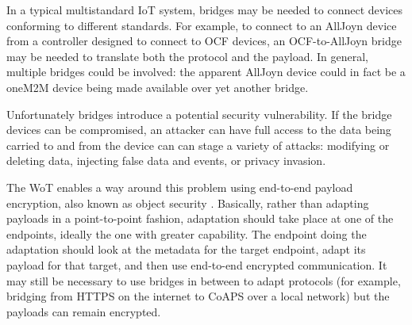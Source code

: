 In a typical multistandard IoT system,
bridges may be needed to connect devices
conforming to different standards.
For example,
to connect to an AllJoyn device from a controller
designed to connect to OCF devices, an OCF-to-AllJoyn bridge
may be needed to translate both the protocol and the payload.
In general, multiple bridges could be involved: the
apparent AllJoyn device could in fact be a oneM2M device
being made available over yet another bridge.

Unfortunately bridges introduce a potential security vulnerability.
If the bridge devices can be compromised,
an attacker can have full access to the
data being carried to and from the device can can stage a 
variety of attacks: 
modifying or deleting data,
injecting false data and events,
or privacy invasion.

The WoT enables a way around this problem using end-to-end payload encryption,
also known as object security \cite{Mattsson2014}.
Basically, rather than adapting payloads in a point-to-point fashion,
adaptation should take place at one of the endpoints, ideally the
one with greater capability.  The endpoint doing the adaptation should
look at the metadata for the target endpoint, adapt its payload for that
target, and then use end-to-end encrypted communication.
It may still be necessary to use bridges in between to adapt protocols
(for example, bridging from HTTPS on the internet to CoAPS over a local
network) but the payloads can remain encrypted.

